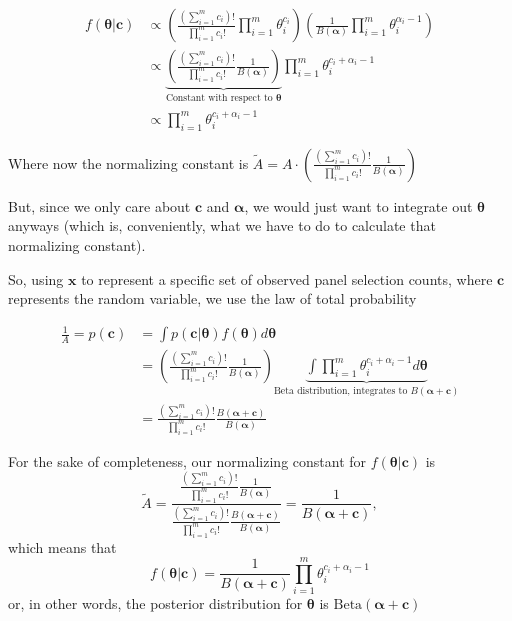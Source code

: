 \documentclass{article}
\begin{document}
\begin{align*}
f(\bm\theta | \bm c) &\propto \left(\frac{\left(\sum_{i=1}^m c_i\right)!}{\prod_{i=1}^m c_i!}\prod_{i=1}^m\theta_i^{c_i}\right)\left(\frac{1}{B(\bm\alpha)}\prod_{i=1}^m\theta_i^{\alpha_i - 1}\right) \\
&\propto\underbrace{ \left(\frac{\left(\sum_{i=1}^m c_i\right)!}{\prod_{i=1}^m c_i!}\frac{1}{B(\bm\alpha)}\right)}_{\text{Constant with respect to }\bm\theta}\prod_{i=1}^m \theta_i^{c_i + \alpha_i - 1}\\
&\propto \prod_{i=1}^m \theta_i^{c_i + \alpha_i - 1} 
\end{align*}

Where now the normalizing constant is $\tilde A = A \cdot \left(\frac{\left(\sum_{i=1}^m c_i\right)!}{\prod_{i=1}^m c_i!}\frac{1}{B(\bm\alpha)}\right)$

But, since we only care about $\bm c$ and $\bm \alpha$, we would just want to integrate out $\bm\theta$ anyways (which is, conveniently, what we have to do to calculate that normalizing constant). 

So, using $\bm x$ to represent a specific set of observed panel selection counts, where $\bm c$ represents the random variable, we use the law of total probability

\begin{align*}
\frac{1}{A} = p(\bm c) & = \int p(\bm c | \bm\theta) f(\bm\theta) d\bm\theta\\
&=\left(\frac{\left(\sum_{i=1}^m c_i\right)!}{\prod_{i=1}^m c_i!}\frac{1}{B(\bm\alpha)}\right) \underbrace{\int \prod_{i=1}^m \theta_i^{c_i + \alpha_i - 1}d\bm\theta}_{\text{Beta distribution, integrates to }B(\bm\alpha + \bm c)}\\
&= \frac{\left(\sum_{i=1}^m c_i\right)!}{\prod_{i=1}^m c_i!}\frac{B(\bm\alpha + \bm c)}{B(\bm\alpha)}
\end{align*}

For the sake of completeness, our normalizing constant for $f(\bm\theta | \bm c)$ is $$\tilde A = \frac{\frac{\left(\sum_{i=1}^m c_i\right)!}{\prod_{i=1}^m c_i!}\frac{1}{B(\bm\alpha)}}{\frac{\left(\sum_{i=1}^m c_i\right)!}{\prod_{i=1}^m c_i!}\frac{B(\bm\alpha + \bm c)}{B(\bm\alpha)}} = \frac{1}{B(\bm \alpha + \bm c)},$$
which means that $$f(\bm\theta | \bm c) = \frac{1}{B(\bm \alpha + \bm c)} \prod_{i=1}^m \theta_i^{c_i + \alpha_i - 1}$$
or, in other words, the posterior distribution for $\bm\theta$ is $\text{Beta}(\bm\alpha + \bm c)$
\end{document}
